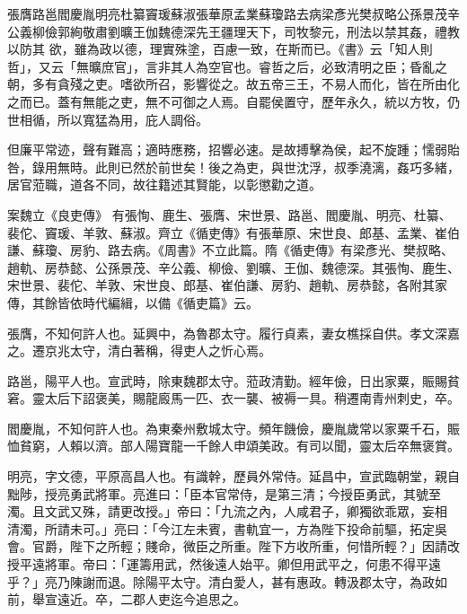 
\begin{pinyinscope}

 張膺路邕閻慶胤明亮杜纂竇瑗蘇淑張華原孟業蘇瓊路去病梁彥光樊叔略公孫景茂辛公義柳儉郭絢敬肅劉曠王伽魏德深先王疆理天下，司牧黎元，刑法以禁其姦，禮教以防其
 欲，雖為政以德，理實殊塗，百慮一致，在斯而已。《書》云「知人則哲」，又云「無曠庶官」，言非其人為空官也。睿哲之后，必致清明之臣；昏亂之朝，多有貪殘之吏。嗜欲所召，影響從之。故五帝三王，不易人而化，皆在所由化之而已。蓋有無能之吏，無不可御之人焉。自罷侯置守，歷年永久，統以方牧，仍世相循，所以寬猛為用，庇人調俗。



 但廉平常迹，聲有難高；適時應務，招響必速。是故搏擊為侯，起不旋踵；懦弱貽咎，錄用無時。此則已然於前世矣！後之為吏，與世沈浮，叔季澆漓，姦巧多緒，居官蒞職，道各不同，故往籍述其賢能，以彰懲勸之道。



 案魏立《良吏傳》
 有張恂、鹿生、張膺、宋世景、路邕、閻慶胤、明亮、杜纂、裴佗、竇瑗、羊敦、蘇淑。齊立《循吏傳》有張華原、宋世良、郎基、孟業、崔伯謙、蘇瓊、房豹、路去病。《周書》不立此篇。隋《循吏傳》有梁彥光、樊叔略、趙軌、房恭懿、公孫景茂、辛公義、柳儉、劉曠、王伽、魏德深。其張恂、鹿生、宋世景、裴佗、羊敦、宋世良、郎基、崔伯謙、房豹、趙軌、房恭懿，各附其家傳，其餘皆依時代編緝，以備《循吏篇》云。



 張膺，不知何許人也。延興中，為魯郡太守。履行貞素，妻女樵採自供。孝文深嘉之。遷京兆太守，清白著稱，得吏人之忻心焉。



 路邕，陽平人也。宣武時，除東魏郡太守。蒞政清勤。經年儉，日出家粟，賑賜貧窘。靈太后下詔褒美，賜龍廄馬一匹、衣一襲、被褥一具。稍遷南青州刺史，卒。



 閻慶胤，不知何許人也。為東秦州敷城太守。頻年饑儉，慶胤歲常以家粟千石，賑恤貧窮，人賴以濟。部人陽寶龍一千餘人申頌美政。有司以聞，靈太后卒無褒賞。



 明亮，字文德，平原高昌人也。有識幹，歷員外常侍。延昌中，宣武臨朝堂，親自黜陟，授亮勇武將軍。亮進曰：「臣本官常侍，是第三清；今授臣勇武，其號至濁。且文武又殊，請更改授。」帝曰：「九流之內，人咸君子，卿獨欲乖眾，妄相
 清濁，所請未可。」亮曰：「今江左未賓，書軌宜一，方為陛下投命前驅，拓定吳會。官爵，陛下之所輕；賤命，微臣之所重。陛下方收所重，何惜所輕？」因請改授平遠將軍。帝曰：「運籌用武，然後遠人始平。卿但用武平之，何患不得平遠乎？」亮乃陳謝而退。除陽平太守。清白愛人，甚有惠政。轉汲郡太守，為政如前，舉宣遠近。卒，二郡人吏迄今追思之。




\end{pinyinscope}

